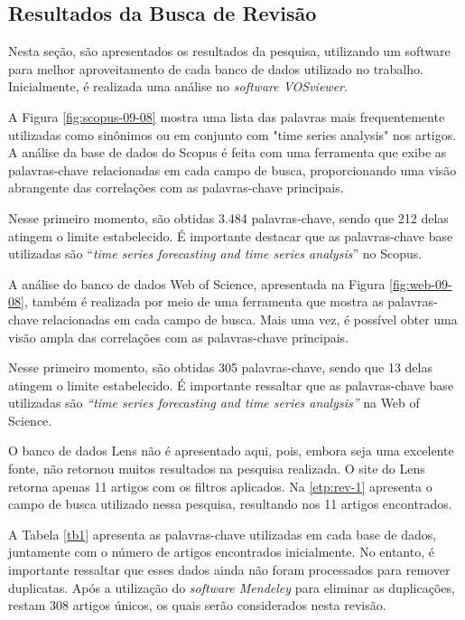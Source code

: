 \subsection{Resultados da Busca de Revis\~ao}\label{subesec:resul da revisão}


Nesta seção, são apresentados os resultados da pesquisa, utilizando um software para melhor aproveitamento de cada banco de dados utilizado no trabalho. Inicialmente, é realizada uma análise no \textit{software VOSviewer}.



A Figura \ref{fig:scopus-09-08} mostra uma lista das palavras mais frequentemente utilizadas como sinônimos ou em conjunto com "time series analysis" nos artigos. A análise da base de dados do Scopus é feita com uma ferramenta que exibe as palavras-chave relacionadas em cada campo de busca, proporcionando uma visão abrangente das correlações com as palavras-chave principais.

Nesse primeiro momento, são obtidas 3.484 palavras-chave, sendo que 212 delas atingem o limite estabelecido. É importante destacar que as palavras-chave base utilizadas são ``\textit{time series forecasting and time series analysis}'' no Scopus.



A análise do banco de dados Web of Science, apresentada na Figura \ref{fig:web-09-08}, também é realizada por meio de uma ferramenta que mostra as palavras-chave relacionadas em cada campo de busca. Mais uma vez, é possível obter uma visão ampla das correlações com as palavras-chave principais.

Nesse primeiro momento, são obtidas 305 palavras-chave, sendo que 13 delas atingem o limite estabelecido. É importante ressaltar que as palavras-chave base utilizadas são \textit{``time series forecasting and time series analysis''} na Web of Science.

O banco de dados Lens não é apresentado aqui, pois, embora seja uma excelente fonte, não retornou muitos resultados na pesquisa realizada. O site do Lens retorna apenas 11 artigos com os filtros aplicados. Na \ref{etp:rev-1} apresenta o campo de busca utilizado nessa pesquisa, resultando nos 11 artigos encontrados.





A Tabela \ref{tb1} apresenta as palavras-chave utilizadas em cada base de dados, juntamente com o número de artigos encontrados inicialmente. No entanto, é importante ressaltar que esses dados ainda não foram processados para remover duplicatas. Após a utilização do \textit{software Mendeley} para eliminar as duplicações, restam 308 artigos únicos, os quais serão considerados nesta revisão.


